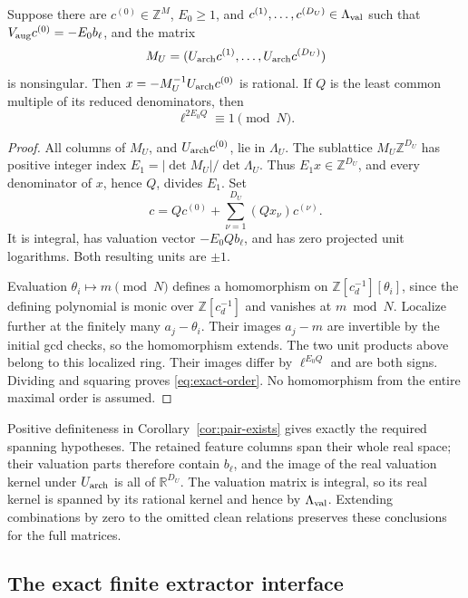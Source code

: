 \begin{lemma}\label{lem:unit-certificate}
Suppose there are \(c^{(0)}\in\mathbb Z^M\), \(E_0\ge1\), and
\(c^{(1)},\ldots,c^{(D_U)}\in\Lambda_{\rm val}\) such that
\(V_{\rm aug}c^{(0)}=-E_0b_\ell\), and the matrix
\[
 M_U=(U_{\rm arch}c^{(1)},\ldots,U_{\rm arch}c^{(D_U)})
\]
is nonsingular.  Then
\(x=-M_U^{-1}U_{\rm arch}c^{(0)}\) is rational.  If \(Q\) is
the least common multiple of its reduced denominators, then
\begin{equation}\label{eq:exact-order}
 \ell^{2E_0Q}\equiv1\pmod N.
\end{equation}
\end{lemma}

\begin{proof}
All columns of \(M_U\), and \(U_{\rm arch}c^{(0)}\), lie in
\(\Lambda_U\).  The sublattice \(M_U\mathbb Z^{D_U}\) has
positive integer index
\(E_1=|\det M_U|/\det\Lambda_U\).  Thus \(E_1x\in\mathbb Z^{D_U}\),
and every denominator of \(x\), hence \(Q\), divides \(E_1\).
Set
\[
 c=Qc^{(0)}+\sum_{\nu=1}^{D_U}(Qx_\nu)c^{(\nu)}.
\]
It is integral, has valuation vector \(-E_0Qb_\ell\), and has
zero projected unit logarithms.  Both resulting units are \(\pm1\).

Evaluation \(\theta_i\mapsto m\pmod N\) defines a homomorphism
on \(\mathbb Z[c_d^{-1}][\theta_i]\), since the defining polynomial
is monic over \(\mathbb Z[c_d^{-1}]\) and vanishes at \(m\bmod N\).
Localize further at the finitely many \(a_j-\theta_i\).  Their
images \(a_j-m\) are invertible by the initial gcd checks, so the
homomorphism extends.  The two unit products above belong to this
localized ring.  Their images differ by \(\ell^{E_0Q}\) and are
both signs.  Dividing and squaring proves \eqref{eq:exact-order}.
No homomorphism from the entire maximal order is assumed.
\end{proof}

Positive definiteness in Corollary~\ref{cor:pair-exists} gives exactly
the required spanning hypotheses.  The retained feature columns span
their whole real space; their valuation parts therefore contain
\(b_\ell\), and the image of the real valuation kernel under
\(U_{\rm arch}\) is all of \(\mathbb R^{D_U}\).
The valuation matrix is integral, so its real kernel is spanned by
its rational kernel and hence by \(\Lambda_{\rm val}\).
Extending combinations by zero to the omitted clean relations
preserves these conclusions for the full matrices.

\subsection{The exact finite extractor interface}

